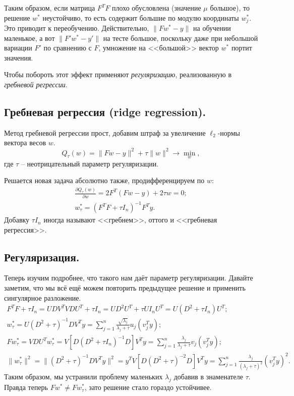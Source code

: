 Таким образом, если матрица $F^TF$ плохо обусловлена (значение $\mu$ большое), то решение $w^*$ неустойчиво, то есть содержит большие по модулю координаты $w_j^*$. Это приводит к переобучению. Действительно, $\|Fw^* - y\|$ на обучении маленькое, а вот $\|F'w^* - y'\|$ на тесте большое, поскольку даже при небольшой вариации $F'$ по сравнению с $F$, умножение на <<большой>> вектор $w^*$ портит значения.

Чтобы побороть этот эффект применяют \textit{регуляризацию}, реализованную в \textit{гребневой регрессии}.

\subsection*{Гребневая регрессия (ridge regression).}
Метод гребневой регрессии прост, добавим штраф за увеличение $\ell_2$-нормы вектора весов $w$.
$$Q_\tau(w) = \|Fw - y\|^2 + \tau \|w\|^2 \to \min_w,$$
где $\tau$ -- неотрицательный параметр регуляризации.

Решается новая задача абсолютно также, продифференцируем по $w$:
\begin{gather*}
    \frac{\partial Q_\tau(w)}{\partial w} = 2 F^T (Fw - y) + 2\tau w = 0; \\
    w_\tau^* = (F^TF + \tau I_n)^{-1} F^Ty.
\end{gather*}
Добавку $\tau I_n$ иногда называют <<гребнем>>, оттого и <<гребневая регрессия>>.

\subsection*{Регуляризация.}
Теперь изучим подробнее, что такого нам даёт параметр регуляризации.
Давайте заметим, что мы всё ещё можем повторить предыдущее решение и применить сингулярное разложение.
\begin{gather*}
    F^TF + \tau I_n = UDV^TVDU^T + \tau I_n = UD^2U^T + \tau UI_nU^T = U(D^2 + \tau I_n)U^T; \\
    w_\tau^* = U(D^2 + \tau)^{-1}DV^Ty = \sum_{j=1}^n \frac{\sqrt{\lambda_j}}{\lambda_j + \tau}u_j(v_j^Ty); \\
    Fw_\tau^* = VDU^Tw_\tau^* = V\left[D(D^2 + \tau I_n)^{-1}D\right]V^Ty = \sum_{j=1}^n \frac{\lambda_j}{\lambda_j + \tau} v_j(v_j^Ty); \\
    \|w_\tau^*\|^2 = \|(D^2 + \tau)^{-1}DV^Ty\|^2 = y^TV\left[D(D^2 + \tau)^{-2}D\right]V^Ty = \sum_{j=1}^n \frac{\lambda_j}{(\lambda_j + \tau)^2}(v_j^Ty)^2.
\end{gather*}
Таким образом, мы устранили проблему маленьких $\lambda_j$ добавив в знаменателе $\tau$. Правда теперь $Fw^* \not= Fw_\tau^*$, зато решение стало гораздо устойчивее.

